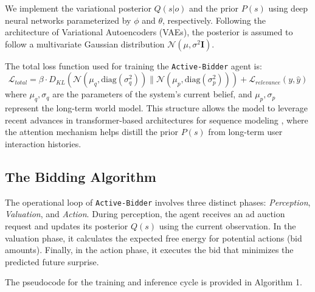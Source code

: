 We implement the variational posterior $Q(s|o)$ and the prior $P(s)$ using deep neural networks parameterized by $\phi$ and $\theta$, respectively. Following the architecture of Variational Autoencoders (VAEs), the posterior is assumed to follow a multivariate Gaussian distribution $\mathcal{N}(\mu, \sigma^2 \mathbf{I})$.

The total loss function used for training the \texttt{Active-Bidder} agent is:
\begin{equation}
\mathcal{L}_{total} = \beta \cdot D_{KL}\left(\mathcal{N}(\mu_q, \text{diag}(\sigma_q^2)) \parallel \mathcal{N}(\mu_p, \text{diag}(\sigma_p^2))\right) + \mathcal{L}_{relevance}(y, \hat{y})
\end{equation}
where $\mu_q, \sigma_q$ are the parameters of the system's current belief, and $\mu_p, \sigma_p$ represent the long-term world model. This structure allows the model to leverage recent advances in transformer-based architectures for sequence modeling \citep{vaswani2017attention}, where the attention mechanism helps distill the prior $P(s)$ from long-term user interaction histories.

\subsection{The Bidding Algorithm}

The operational loop of \texttt{Active-Bidder} involves three distinct phases: \textit{Perception}, \textit{Valuation}, and \textit{Action}. During perception, the agent receives an ad auction request and updates its posterior $Q(s)$ using the current observation. In the valuation phase, it calculates the expected free energy for potential actions (bid amounts). Finally, in the action phase, it executes the bid that minimizes the predicted future surprise.

The pseudocode for the training and inference cycle is provided in Algorithm 1.

